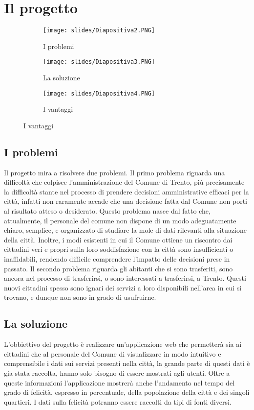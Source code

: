\chapter[Slide pitch]{Il progetto \ProjectTitle}
\thispagestyle{stdPage}
\begin{figure}[H]
    \centering
    \begin{subfigure}{0.3\textwidth}
        \texttt{[image: slides/Diapositiva2.PNG]}
        \caption{I problemi}
    \end{subfigure}
    \begin{subfigure}{0.3\textwidth}
        \texttt{[image: slides/Diapositiva3.PNG]}
        \caption{La soluzione}
    \end{subfigure}
    \begin{subfigure}{0.3\textwidth}
        \texttt{[image: slides/Diapositiva4.PNG]}
        \caption{I vantaggi}
    \end{subfigure}
\end{figure}

\section{I problemi}
    Il progetto mira a risolvere due problemi. Il primo problema riguarda una difficoltà che colpisce l'amministrazione del Comune di Trento, più precisamente la difficoltà stante nel processo di prendere decisioni amministrative efficaci per la città, infatti non raramente accade che una decisione fatta dal Comune non porti al risultato atteso o desiderato. Questo problema nasce dal fatto che, attualmente, il personale del comune non dispone di un modo adeguatamente chiaro, semplice, e organizzato di studiare la mole di dati rilevanti alla situazione della città. Inoltre, i modi esistenti in cui il Comune ottiene un riscontro dai cittadini veri e propri sulla loro soddisfazione con la città sono insufficienti o inaffidabili, rendendo difficile comprendere l'impatto delle decisioni prese in passato. Il secondo problema riguarda gli abitanti che si sono trasferiti, sono ancora nel processo di trasferirsi, o sono interessati a trasferirsi, a Trento. Questi nuovi cittadini spesso sono ignari dei servizi a loro disponibili nell'area in cui si trovano, e dunque non sono in grado di usufruirne.

\section{La soluzione}
    L'obbiettivo del progetto è realizzare un'applicazione web che permetterà sia ai cittadini che al personale del Comune di visualizzare in modo intuitivo e comprensibile i dati sui servizi presenti nella città, la grande parte di questi dati è gia stata raccolta, hanno solo bisogno di essere mostrati agli utenti. Oltre a queste informazioni l'applicazione mostrerà anche l'andamento nel tempo del grado di felicità, espresso in percentuale, della popolazione della città e dei singoli quartieri. I dati sulla felicità potranno essere raccolti da tipi di fonti diversi.

